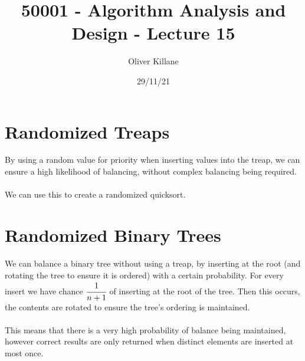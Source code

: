 \documentclass{report}
\title{50001 - Algorithm Analysis and Design - Lecture 15}
\author{Oliver Killane}
\date{29/11/21}
\begin{document}
\maketitle
{}

\section*{Randomized Treaps}
By using a random value for priority when inserting values into the treap, we can ensure a high likelihood of balancing, without complex balancing being required.
\\
\\ We can use this to create a randomized quicksort.

\section*{Randomized Binary Trees}
We can balance a binary tree without using a treap, by inserting at the root (and rotating the tree to ensure it is ordered) with a certain probability.
For every insert we have chance $\cfrac{1}{n+1}$ of inserting at the root of the tree. Then this occurs, the contents are rotated to ensure the tree's ordering is maintained.
\\
\\ This means that there is a very high probability of balance being maintained, however correct results are only returned when distinct elements are inserted at most once.
\end{document}
